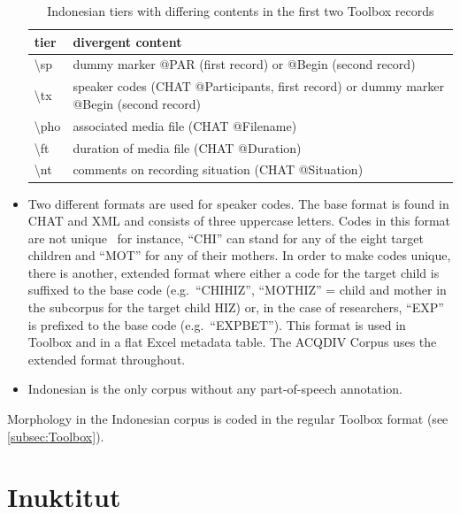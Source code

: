 \documentclass[a4paper, 11pt]{book}
\newcommand{\bks}{\textbackslash}	%
\begin{document}
\begin{itemize}
		\begin{table}[h!]
			\centering
			\begin{tabular}{lp{}}
				\toprule
					\textbf{tier}	& \textbf{divergent content} \\
				\midrule
					\bks sp 	&  dummy marker @PAR (first record) or @Begin (second record) \\
					\bks tx 	&  speaker codes (CHAT @Participants, first record) or dummy marker @Begin (second record)\\
					\bks pho 	&  associated media file (CHAT @Filename) \\
					\bks ft 	&  duration of media file (CHAT @Duration) \\
					\bks nt 	&  comments on recording situation (CHAT @Situation) \\
				\bottomrule
			\end{tabular}
			\caption{Indonesian tiers with differing contents in the first two Toolbox records}
			\label{tab:Indonesian tiers with different contents in the first two Toolbox records}
		\end{table}
		
	\item Two different formats are used for speaker codes. The base format is found in CHAT and XML and consists of three uppercase letters. 
		Codes in this format are not unique \textendash\ for instance, “CHI” can stand for any of the eight target children and “MOT” for any
		of their mothers. In order to make codes unique, there is another, extended format where either a code for the target child is suffixed
		to the base code (e.g.\ “CHIHIZ”, “MOTHIZ” = child and mother in the subcorpus for the target child HIZ) or, in the case of researchers, 
		“EXP” is prefixed to the base code (e.g.\ “EXPBET”). This format is used in Toolbox and in a flat Excel metadata table. 
		The ACQDIV Corpus uses the extended format throughout. 
	\item Indonesian is the only corpus without any part-of-speech annotation. 
\end{itemize}

\noindent Morphology in the Indonesian corpus is coded in the regular Toolbox format (see \autoref{subsec:Toolbox}). 


\section{Inuktitut}
\label{sec:Inuktitut}
\end{document}
